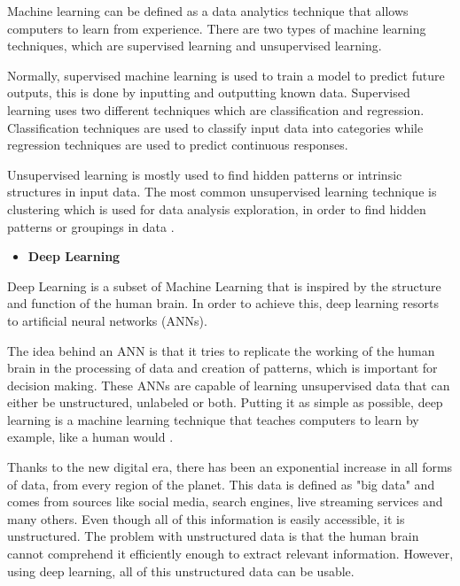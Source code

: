     \par Machine learning can be defined as a data analytics technique that allows computers to learn from experience. There are two types of machine learning techniques, which are supervised learning and unsupervised learning.
    \par Normally, supervised machine learning is used to train a model to predict future outputs, this is done by inputting and outputting known data. Supervised learning uses two different techniques which are classification and regression. Classification techniques are used to classify input data into categories while regression techniques are used to predict continuous responses. 
    \par Unsupervised learning is mostly used to find hidden patterns or intrinsic structures in input data. The most common unsupervised learning technique is clustering which is used for data analysis exploration, in order to find hidden patterns or groupings in data \cite{mathworks_ML}.

    \begin{itemize}
        \item \textbf{Deep Learning}
    \end{itemize}
    

    \par Deep Learning is a subset of Machine Learning that is inspired by the structure and function of the human brain. In order to achieve this, deep learning resorts to artificial neural networks (ANNs).
    
    \par The idea behind an ANN is that it tries to replicate the working of the human brain in the processing of data and creation of patterns, which is important for decision making. These ANNs are capable of learning unsupervised data that can either be unstructured, unlabeled or both. Putting it as simple as possible, deep learning is a machine learning technique that teaches computers to learn by example, like a human would \cite{mathworks_deeplearning}.


    \par Thanks to the new digital era, there has been an exponential increase in all forms of data, from every region of the planet. This data is defined as "big data" and comes from sources like social media, search engines, live streaming services and many others. Even though all of this information is easily accessible, it is unstructured. The problem with unstructured data is that the human brain cannot comprehend it efficiently enough to extract relevant information. However, using deep learning, all of this unstructured data can be usable.


